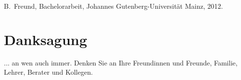 \documentclass[a4paper,11pt,oneside,final,german,openbib,pdftex]{scrbook}
\begin{document}
\begin{appendix}
\begin{thebibliography}{99}
  B.~Freund, 
  Bachelorarbeit, Johannes Gutenberg-Universit\"at Mainz, 2012.

\end{thebibliography}

\chapter{Danksagung}

... an wen auch immer. Denken Sie an Ihre Freundinnen und Freunde, 
Familie, Lehrer, Berater und Kollegen.

\end{appendix}
\end{document}
